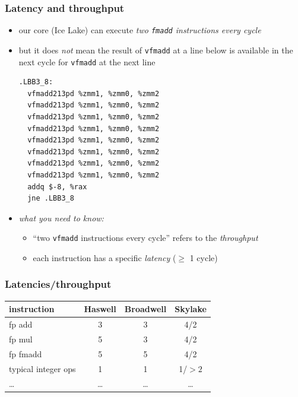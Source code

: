 \documentclass[12pt,dvipdfmx]{beamer}
\newcommand{\ao}[1]{{\color{blue}#1}}
\newcommand{\aka}[1]{{\color{red}#1}}
\begin{document}
\begin{frame}[fragile]
\frametitle{Latency and throughput}

\begin{itemize}
\item our core (Ice Lake) can execute
  \ao{\it two {\tt fmadd} instructions every cycle}

\item but it does \aka{\emph{not}} mean the result of 
  \texttt{vfmadd} at a line below is available in the next cycle
  for \texttt{vfmadd} at the next line

  {\footnotesize
\begin{lstlisting}
.LBB3_8:
  vfmadd213pd %zmm1, %zmm0, %zmm2
  vfmadd213pd %zmm1, %zmm0, %zmm2
  vfmadd213pd %zmm1, %zmm0, %zmm2
  vfmadd213pd %zmm1, %zmm0, %zmm2
  vfmadd213pd %zmm1, %zmm0, %zmm2
  vfmadd213pd %zmm1, %zmm0, %zmm2
  vfmadd213pd %zmm1, %zmm0, %zmm2
  vfmadd213pd %zmm1, %zmm0, %zmm2
  addq $-8, %rax
  jne .LBB3_8
\end{lstlisting}} %

\item<2-> \ao{\emph{what you need to know:}}
  \begin{itemize}
  \item ``two \texttt{vfmadd} instructions every cycle'' 
    refers to the \ao{\em throughput}
  \item each instruction has a specific \ao{\em latency} ($\geq$ 1 cycle)
  \end{itemize}
\end{itemize}
\end{frame}

\begin{frame}[fragile]
  \frametitle{Latencies/throughput}
\begin{center}
  \begin{tabular}{|l|c|c|c|}\hline
instruction           & Haswell & Broadwell & Skylake \\\hline
  fp add              & 3       & 3         & \ao{4}/\ao{2} \\
  fp mul              & 5       & 3         & \ao{4}/\ao{2} \\
  fp fmadd            & 5       & 5         & \ao{4}/\ao{2} \\
  typical integer ops & 1       & 1         & \ao{1}/\ao{$>2$} \\
  \ldots              & \ldots  & \ldots    & \ldots \\
\hline
  \end{tabular}
\end{center}
\end{frame}
\end{document}
